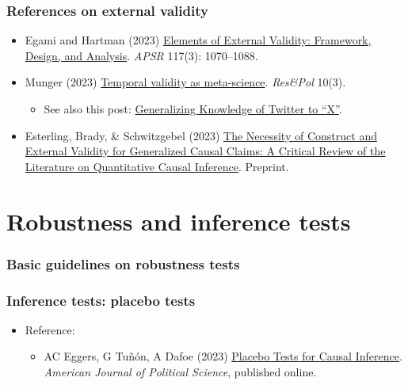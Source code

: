 \documentclass[aspectratio=43]{beamer}
\begin{document}
\begin{frame}
\frametitle{References on external validity}
\centering

\begin{itemize}
  \item Egami and Hartman (2023) \href{https://doi.org/10.1017/S0003055422000880}{Elements of External Validity: Framework, Design, and Analysis}. \textit{APSR} 117(3): 1070--1088.
  \item Munger (2023) \href{https://doi.org/10.1177/20531680231187271}{Temporal validity as meta-science}. \textit{Res\&Pol} 10(3).
  \begin{itemize}
    \item See also this post: \href{https://kevinmunger.substack.com/p/generalizing-knowledge-of-twitter}{Generalizing Knowledge of Twitter to ``X''}.
  \end{itemize}
  \item Esterling, Brady, \& Schwitzgebel (2023) \href{https://osf.io/2s8w5/}{The Necessity of Construct and External Validity for Generalized Causal Claims: A Critical Review of the Literature on Quantitative Causal Inference}. Preprint.
\end{itemize}

\end{frame}

\section{Robustness and inference tests}


\begin{frame}
\frametitle{Basic guidelines on robustness tests}
\centering



\end{frame}

\begin{frame}
\frametitle{Inference tests: placebo tests}
\centering

\begin{itemize}
  \item Reference:
  \begin{itemize}
    \item AC Eggers, G Tuñón, A Dafoe (2023) \href{https://doi.org/10.1111/ajps.12818}{Placebo Tests for Causal Inference}. \textit{American Journal of Political Science}, published online.
  \end{itemize}
\end{itemize}

\end{frame}
\end{document}
